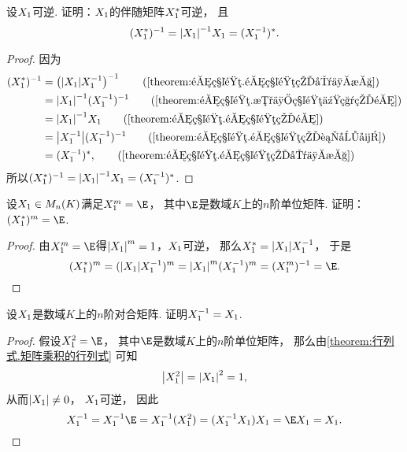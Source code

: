 \begin{example}\label{theorem:逆矩阵.伴随矩阵的逆与逆矩阵的伴随}
设\(X_1\)可逆.
证明：\(X_1\)的伴随矩阵\(X_1^*\)可逆，
且\begin{equation}
	(X_1^*)^{-1}
	= \abs{X_1}^{-1} X_1
	= (X_1^{-1})^*.
\end{equation}
\begin{proof}
因为\begin{align*}
	(\A^*)^{-1}
	&= \left( \abs{\A} \A^{-1} \right)^{-1}
		\tag{\cref{theorem:逆矩阵.逆矩阵的唯一性}} \\
	&= \abs{\A}^{-1} (\A^{-1})^{-1}
		\tag{\cref{theorem:逆矩阵.数与矩阵乘积的逆}} \\
	&= \abs{\A}^{-1} \A
		\tag{\cref{theorem:逆矩阵.逆矩阵的逆}} \\
	&= \abs{\A^{-1}} (\A^{-1})^{-1}
		\tag{\cref{theorem:逆矩阵.逆矩阵的行列式}} \\
	&= (\A^{-1})^*,
		\tag{\cref{theorem:逆矩阵.逆矩阵的唯一性}}
\end{align*}
所以\((X_1^*)^{-1}
= \abs{X_1}^{-1} X_1
= (X_1^{-1})^*\).
\end{proof}
\end{example}
\begin{example}
设\(X_1 \in M_n(K)\)满足\(\A^m = \E\)，
其中\(\E\)是数域\(K\)上的\(n\)阶单位矩阵.
证明：\((\A^*)^m = \E\).
\begin{proof}
由\(\A^m = \E\)得\(\abs{X_1}^m = 1\)，\(X_1\)可逆，
那么\(X_1^* = \abs{X_1} X_1^{-1}\)，
于是\[
	(\A^*)^m
	= (\abs{\A} \A^{-1})^m
	= \abs{\A}^m (\A^{-1})^m
	= (\A^m)^{-1}
	= \E.
	\qedhere
\]
\end{proof}
\end{example}

\begin{example}\label{example:对合矩阵.对合矩阵的逆矩阵}
设\(X_1\)是数域\(K\)上的\(n\)阶对合矩阵.
证明\(X_1^{-1} = X_1\).
\begin{proof}
假设\(\A^2=\E\)，
其中\(\E\)是数域\(K\)上的\(n\)阶单位矩阵，
那么由\cref{theorem:行列式.矩阵乘积的行列式} 可知\[
	\abs{X_1^2}
	= \abs{X_1}^2
	= 1,
\]
从而\(\abs{X_1}\neq0\)，
\(X_1\)可逆，
因此\[
	\A^{-1}
	= \A^{-1}\E
	= \A^{-1}(\A^2)
	= (\A^{-1}\A)\A
	= \E\A
	= \A.
	\qedhere
\]
\end{proof}
\end{example}

